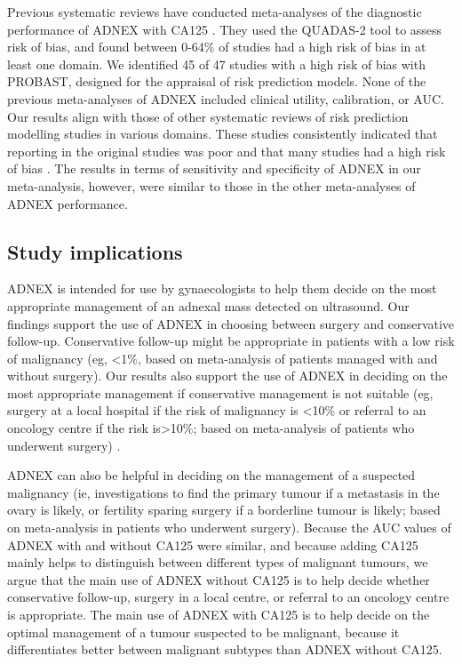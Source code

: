 Previous systematic reviews have conducted meta-analyses of the diagnostic
performance of \gls{ADNEX} with CA125
 \cite{cuiDiagnosticAccuraciesUltrasound2022,
  davenportMenopausalStatusUltrasound2022,
  huangDiagnosticAccuracyADNEX2021,westwoodRiskScoresGuide2018,
  yueValueAssessmentDifferent2022}.
They used the \gls{QUADAS}-2 tool \cite{whitingQUADAS2RevisedTool2011} to assess risk
of bias, and found between 0-64\% of studies had a high risk of bias in
at least one domain. We identified 45 of 47 studies with a high risk of bias with PROBAST, designed for the appraisal of risk prediction models. None of the previous meta-analyses of ADNEX included clinical utility, calibration, or AUC. Our results align with those of other systematic reviews of risk prediction modelling studies in various domains. These studies consistently indicated that reporting in the original studies was poor and that many studies had a high risk of bias  \cite{collinsExternalValidationMultivariable2014,
  wynantsPredictionModelsDiagnosis2020,
  helmrichDoesPoorMethodological2022,
  dhimanReportingPrognosticClinical2021,andaurnavarroRiskBiasStudies2021,
  alloteyExternalValidationPrognostic2022,
  bouwmeesterReportingMethodsClinical2012}.
The results in terms of sensitivity and specificity of ADNEX in our meta-analysis, however, were similar to those in the other meta-analyses of ADNEX performance.

\subsection{Study implications}

ADNEX is intended for use by gynaecologists to help them decide on the most appropriate management of an adnexal mass detected on ultrasound. Our findings support the use of ADNEX in choosing between surgery and conservative follow-up. Conservative follow-up might be appropriate in patients with a low risk of malignancy (eg, <1\%, based on meta-analysis of patients managed with and without surgery). Our results also support the use of ADNEX in deciding on the most appropriate management if conservative management is not suitable (eg, surgery at a local hospital if the risk of malignancy is <10\% or referral to an oncology centre if the risk is>10\%; based on meta-analysis of patients who underwent surgery) \cite{timmermanESGOISUOGIOTA2021}.

ADNEX can also be helpful in deciding on the management of a suspected malignancy (ie, investigations to find the primary tumour if a metastasis in the ovary is likely, or fertility sparing surgery if a borderline tumour is likely; based on meta-analysis in patients who underwent surgery). Because the AUC values of ADNEX with and without CA125 were similar, and because adding CA125 mainly helps to distinguish between different types of malignant tumours, we argue that the main use of ADNEX without CA125 is to help decide whether conservative follow-up, surgery in a local centre, or referral to an oncology centre is appropriate. The main use of ADNEX with CA125 is to help decide on the optimal management of a tumour suspected to be malignant, because it differentiates better between malignant subtypes than ADNEX without CA125.

